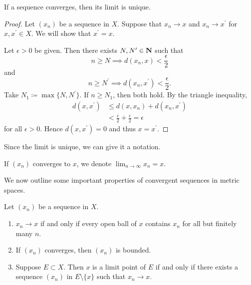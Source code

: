 \begin{lemma}
If a sequence converges, then its limit is unique.
\end{lemma}

\begin{proof}
Let $(x_n)$ be a sequence in $X$. Suppose that $x_n\to x$ and $x_n\to x^\prime$ for $x,x^\prime\in X$. We will show that $x^\prime=x$.

Let $\epsilon>0$ be given. Then there exists $N,N^\prime\in\mathbf N$ such that
\[n\ge N\implies d(x_n,x)<\frac{\epsilon}{2}\]
and
\[n\ge N^\prime\implies d(x_n,x^\prime)<\frac{\epsilon}{2}.\]
Take $N_1\coloneqq\max\{N,N^\prime\}$. If $n\ge N_1$, then both hold. By the triangle inequality,
\begin{align*}
d(x,x^\prime)&\le d(x,x_n)+d(x_n,x^\prime)\\
&<\frac{\epsilon}{2}+\frac{\epsilon}{2}=\epsilon
\end{align*}
for all $\epsilon>0$. Hence $d(x,x^\prime)=0$ and thus $x=x^\prime$.
\end{proof}

Since the limit is unique, we can give it a notation.

\begin{notation}
If $(x_n)$ converges to $x$, we denote $\displaystyle\lim_{n\to\infty}x_n=x$.
\end{notation}

We now outline some important properties of convergent sequences in metric spaces.

\begin{proposition}
Let $(x_n)$ be a sequence in $X$.
\begin{enumerate}[label=(\roman*)]
\item $x_n\to x$ if and only if every open ball of $x$ contains $x_n$ for all but finitely many $n$.
\item If $(x_n)$ converges, then $(x_n)$ is bounded.
\item Suppose $E\subset X$. Then $x$ is a limit point of $E$ if and only if there exists a sequence $(x_n)$ in $E\setminus\{x\}$ such that $x_n\to x$.
\end{enumerate}
\end{proposition}

